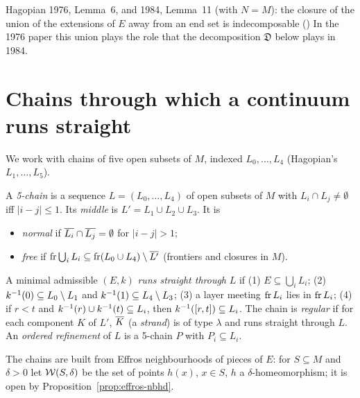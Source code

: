 
\begin{remark}
Hagopian 1976, Lemma~6, and 1984, Lemma~11 (with $N=M$): the closure of the union of the extensions of $E$ away from an end
set is indecomposable () In
the 1976 paper this union plays the role that the decomposition $\mathfrak D$ below plays in 1984.
\end{remark}

\section{Chains through which a continuum runs straight}

We work with chains of five open subsets of $M$, indexed $L_0,\dots,L_4$ (Hagopian's $L_1,\dots,L_5$).

\begin{definition}\label{def:chain5}
A \emph{5-chain} is a sequence $L=(L_0,\dots,L_4)$ of open subsets of $M$ with $L_i\cap L_j\ne\emptyset$ iff $|i-j|\le1$. Its
\emph{middle} is $L'=L_1\cup L_2\cup L_3$. It is
\begin{itemize}
\item \emph{normal} if $\overline{L_i}\cap\overline{L_j}=\emptyset$ for $|i-j|>1$;
\item \emph{free} if $\operatorname{fr}\bigcup_iL_i\subseteq\operatorname{fr}(L_0\cup L_4)\setminus\overline{L'}$ (frontiers and closures in $M$).
\end{itemize}
A minimal admissible $(E,k)$ \emph{runs straight through} $L$ if (1) $E\subseteq\bigcup_iL_i$; (2) $k^{-1}(0)\subseteq L_0\setminus L_1$
and $k^{-1}(1)\subseteq L_4\setminus L_3$; (3) a layer meeting $\operatorname{fr} L_i$ lies in $\operatorname{fr} L_i$; (4) if $r<t$ and $k^{-1}(r)\cup k^{-1}(t)\subseteq
L_i$, then $k^{-1}([r,t])\subseteq L_i$. The chain is \emph{regular} if for each component $K$ of $L'$, $\overline{K}$ (a
\emph{strand}) is of type $\lambda$ and runs straight through $L$. An \emph{ordered refinement} of $L$ is a 5-chain $P$ with
$P_i\subseteq L_i$.
\end{definition}


The chains are built from Effros neighbourhoods of pieces of $E$: for $S\subseteq M$ and $\delta>0$ let $\mathcal{W}(S,\delta)$ be the
set of points $h(x)$, $x\in S$, $h$ a $\delta$-homeomorphism; it is open by Proposition~\ref{prop:effros-nbhd}.

